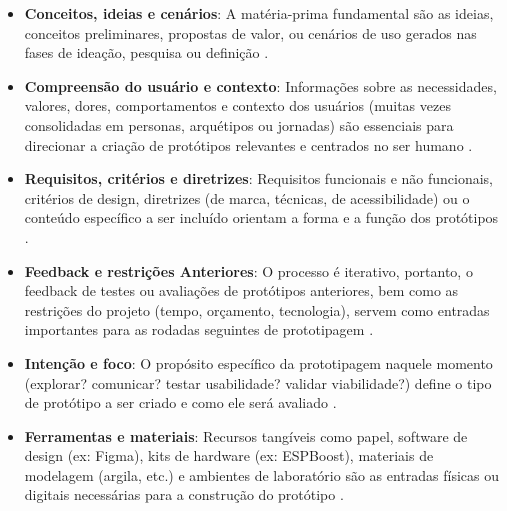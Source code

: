 \begin{itemize}
	\item \textbf{Conceitos, ideias e cenários}: A matéria-prima fundamental são as ideias, conceitos preliminares, propostas de valor, ou cenários de uso gerados nas fases de ideação, pesquisa ou definição \cite{iriarte2023service, mager2023product, paust2025integrative, schlott2024design, you2022applying, asbjornsen2022echange, giraldo2024ecotourism, kumar2023rheumatology, lee2023industry, milton2021eatingdisorders, seko2024transitions, soto2023prototyping, Suryawati2024}.
	
	\item \textbf{Compreensão do usuário e contexto}: Informações sobre as necessidades, valores, dores, comportamentos e contexto dos usuários (muitas vezes consolidadas em personas, arquétipos ou jornadas) são essenciais para direcionar a criação de protótipos relevantes e centrados no ser humano \cite{quintero2021interdisciplinary, iriarte2023service, asbjornsen2022echange, dehmel2021weather, kumar2023rheumatology, lambe2022capabilities, milton2021eatingdisorders, soto2023prototyping}.
	
	\item \textbf{Requisitos, critérios e diretrizes}: Requisitos funcionais e não funcionais, critérios de design, diretrizes (de marca, técnicas, de acessibilidade) ou o conteúdo específico a ser incluído orientam a forma e a função dos protótipos \cite{quintero2021interdisciplinary, nguyen2022human, asbjornsen2022echange, villa2022integratedcare, Suryawati2024, hegemann2024palette}.
	
	\item \textbf{Feedback e restrições Anteriores}: O processo é iterativo, portanto, o feedback de testes ou avaliações de protótipos anteriores, bem como as restrições do projeto (tempo, orçamento, tecnologia), servem como entradas importantes para as rodadas seguintes de prototipagem \cite{hegemann2024palette, asbjornsen2022echange, villa2022integratedcare, Suryawati2024}.
	
	\item \textbf{Intenção e foco}: O propósito específico da prototipagem naquele momento (explorar? comunicar? testar usabilidade? validar viabilidade?) define o tipo de protótipo a ser criado e como ele será avaliado \cite{paust2025integrative, mager2023product}.
	
	\item \textbf{Ferramentas e materiais}: Recursos tangíveis como papel, software de design (ex: Figma), kits de hardware (ex: ESPBoost), materiais de modelagem (argila, etc.) e ambientes de laboratório são as entradas físicas ou digitais necessárias para a construção do protótipo \cite{Kim2024, villa2022integratedcare, lee2023industry, soto2023prototyping, yan2022pssvalue}.
	
	
\end{itemize}

